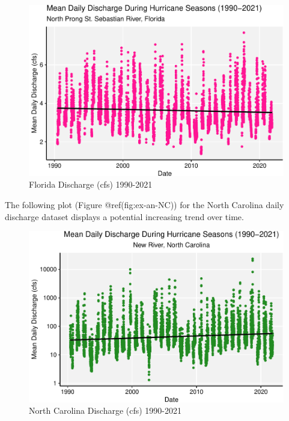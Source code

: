 \documentclass[
  12pt,
]{article}
\begin{document}
\begin{figure}

{\centering \includegraphics{BoosBrantleyHusted_ENV872_Project_files/figure-latex/ex-an-FL-1} 

}

\caption{Florida Discharge (cfs) 1990-2021}\label{fig:ex-an-FL}
\end{figure}

The following plot (Figure @ref(fig:ex-an-NC)) for the North Carolina
daily discharge dataset displays a potential increasing trend over time.

\begin{figure}

{\centering \includegraphics{BoosBrantleyHusted_ENV872_Project_files/figure-latex/ex-an-NC-1} 

}

\caption{North Carolina Discharge (cfs) 1990-2021}\label{fig:ex-an-NC}
\end{figure}
\end{document}
